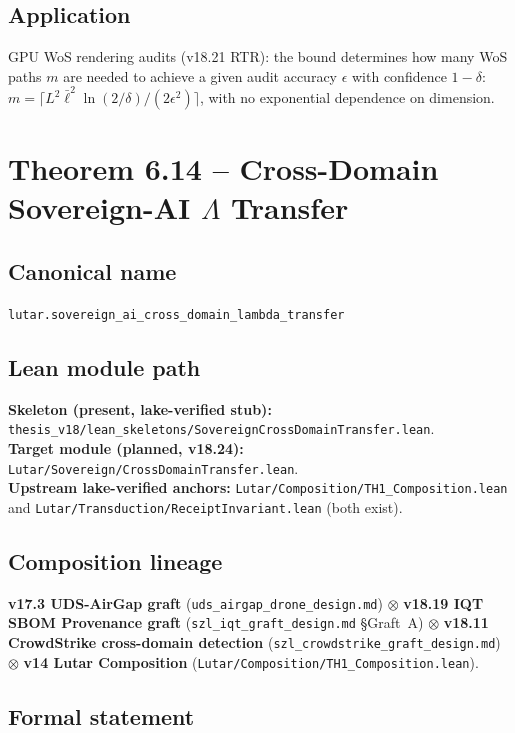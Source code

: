\subsection*{Application}

GPU WoS rendering audits (v18.21 RTR): the bound determines how many
WoS paths $m$ are needed to achieve a given audit accuracy
$\epsilon$ with confidence $1 - \delta$:
$m = \lceil L^2\bar{\ell}^2 \ln(2/\delta) / (2\epsilon^2) \rceil$,
with no exponential dependence on dimension.

\section{Theorem 6.14 -- Cross-Domain Sovereign-AI $\Lambda$ Transfer}
\label{sec:thm14}

\subsection*{Canonical name}
\verb|lutar.sovereign_ai_cross_domain_lambda_transfer|

\subsection*{Lean module path}
\textbf{Skeleton (present, lake-verified stub):}
\texttt{thesis\_v18/lean\_skeletons/SovereignCrossDomainTransfer.lean}.\\
\textbf{Target module (planned, v18.24):}
\texttt{Lutar/Sovereign/CrossDomainTransfer.lean}.\\
\textbf{Upstream lake-verified anchors:}
\texttt{Lutar/Composition/TH1\_Composition.lean} and
\texttt{Lutar/Transduction/ReceiptInvariant.lean} (both exist).

\subsection*{Composition lineage}
\textbf{v17.3 UDS-AirGap graft}
(\texttt{uds\_airgap\_drone\_design.md}) $\otimes$
\textbf{v18.19 IQT SBOM Provenance graft}
(\texttt{szl\_iqt\_graft\_design.md} \S{}Graft~A) $\otimes$
\textbf{v18.11 CrowdStrike cross-domain detection}
(\texttt{szl\_crowdstrike\_graft\_design.md}) $\otimes$
\textbf{v14 Lutar Composition}
(\texttt{Lutar/Composition/TH1\_Composition.lean}).

\subsection*{Formal statement}

